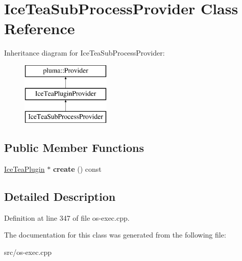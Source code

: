 \hypertarget{class_ice_tea_sub_process_provider}{}\section{Ice\+Tea\+Sub\+Process\+Provider Class Reference}
\label{class_ice_tea_sub_process_provider}
Inheritance diagram for Ice\+Tea\+Sub\+Process\+Provider\+:\begin{figure}[H]
\begin{center}
\leavevmode
\includegraphics[height=3.000000cm]{class_ice_tea_sub_process_provider}
\end{center}
\end{figure}
\subsection*{Public Member Functions}
\begin{DoxyCompactItemize}
\item 
\hyperlink{class_ice_tea_plugin}{Ice\+Tea\+Plugin} $\ast$ {\bfseries create} () const \hypertarget{class_ice_tea_sub_process_provider_a7cbdb64f190e7adbae38f3e207e5dcbe}{}\label{class_ice_tea_sub_process_provider_a7cbdb64f190e7adbae38f3e207e5dcbe}

\end{DoxyCompactItemize}


\subsection{Detailed Description}


Definition at line 347 of file os-\/exec.\+cpp.



The documentation for this class was generated from the following file\+:\begin{DoxyCompactItemize}
\item 
src/os-\/exec.\+cpp\end{DoxyCompactItemize}
